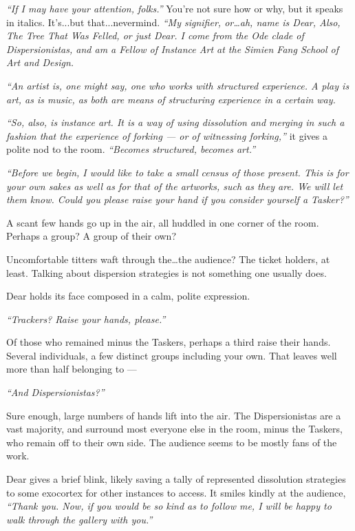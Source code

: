 \null
\vfill

\newpage

\noindent \emph{``If I may have your attention, folks.''} You're not sure how or why, but it speaks in italics. It's...but that...nevermind. \emph{``My signifier, or\ldots{}ah, name is Dear, Also, The Tree That Was Felled, or just Dear. I come from the Ode clade of Dispersionistas, and am a Fellow of Instance Art at the Simien Fang School of Art and Design.}

\emph{``An artist is, one might say, one who works with structured experience. A play is art, as is music, as both are means of structuring experience in a certain way.}

\emph{``So, also, is instance art. It is a way of using dissolution and merging in such a fashion that the experience of forking --- or of witnessing forking,''} it gives a polite nod to the room. \emph{``Becomes structured, becomes art.''}

\emph{``Before we begin, I would like to take a small census of those present. This is for your own sakes as well as for that of the artworks, such as they are. We will let them know. Could you please raise your hand if you consider yourself a Tasker?''}

A scant few hands go up in the air, all huddled in one corner of the room. Perhaps a group? A group of their own?

Uncomfortable titters waft through the\ldots{}the audience? The ticket holders, at least. Talking about dispersion strategies is not something one usually does.

Dear holds its face composed in a calm, polite expression.

\emph{``Trackers? Raise your hands, please.''}

Of those who remained minus the Taskers, perhaps a third raise their hands. Several individuals, a few distinct groups including your own. That leaves well more than half belonging to ---

\emph{``And Dispersionistas?''}

Sure enough, large numbers of hands lift into the air. The Dispersionistas are a vast majority, and surround most everyone else in the room, minus the Taskers, who remain off to their own side. The audience seems to be mostly fans of the work.

Dear gives a brief blink, likely saving a tally of represented dissolution strategies to some exocortex for other instances to access. It smiles kindly at the audience, \emph{``Thank you. Now, if you would be so kind as to follow me, I will be happy to walk through the gallery with you.''}

